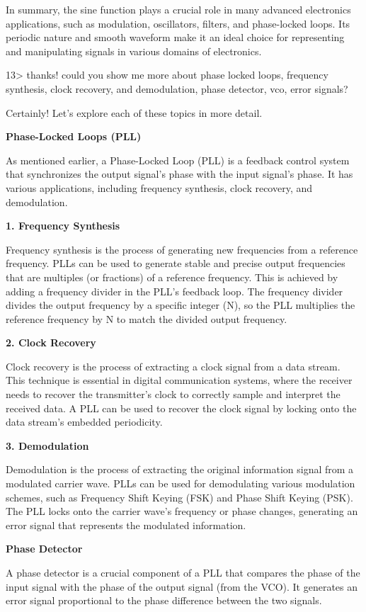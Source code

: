 \documentclass[
]{article}
\begin{document}
In summary, the sine function plays a crucial role in many advanced
electronics applications, such as modulation, oscillators, filters, and
phase-locked loops. Its periodic nature and smooth waveform make it an
ideal choice for representing and manipulating signals in various
domains of electronics.

13\textgreater{} thanks! could you show me more about phase locked
loops, frequency synthesis, clock recovery, and demodulation, phase
detector, vco, error signals?

Certainly! Let's explore each of these topics in more detail.

\textbf{Phase-Locked Loops (PLL)}

As mentioned earlier, a Phase-Locked Loop (PLL) is a feedback control
system that synchronizes the output signal's phase with the input
signal's phase. It has various applications, including frequency
synthesis, clock recovery, and demodulation.

\textbf{1. Frequency Synthesis}

Frequency synthesis is the process of generating new frequencies from a
reference frequency. PLLs can be used to generate stable and precise
output frequencies that are multiples (or fractions) of a reference
frequency. This is achieved by adding a frequency divider in the PLL's
feedback loop. The frequency divider divides the output frequency by a
specific integer (N), so the PLL multiplies the reference frequency by N
to match the divided output frequency.

\textbf{2. Clock Recovery}

Clock recovery is the process of extracting a clock signal from a data
stream. This technique is essential in digital communication systems,
where the receiver needs to recover the transmitter's clock to correctly
sample and interpret the received data. A PLL can be used to recover the
clock signal by locking onto the data stream's embedded periodicity.

\textbf{3. Demodulation}

Demodulation is the process of extracting the original information
signal from a modulated carrier wave. PLLs can be used for demodulating
various modulation schemes, such as Frequency Shift Keying (FSK) and
Phase Shift Keying (PSK). The PLL locks onto the carrier wave's
frequency or phase changes, generating an error signal that represents
the modulated information.

\textbf{Phase Detector}

A phase detector is a crucial component of a PLL that compares the phase
of the input signal with the phase of the output signal (from the VCO).
It generates an error signal proportional to the phase difference
between the two signals.
\end{document}
